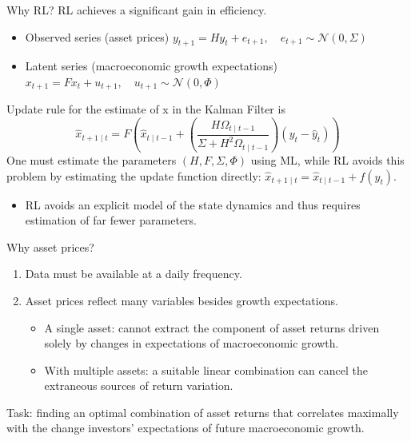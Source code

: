\documentclass[UTF8, 16pt]{beamer}
\begin{document}
\begin{CJK*}{UTF8}{gbsn}
\begin{frame}{Why RL? RL achieves a significant gain in efficiency.}
	\begin{itemize}
		\item Observed series (asset prices)
			$y_{t+1}=H y_{t}+e_{t+1}, \quad e_{t+1} \sim \mathcal{N}(0, \Sigma)$
		\item Latent series (macroeconomic growth expectations)
			$x_{t+1}=F x_{t}+u_{t+1}, \quad u_{t+1} \sim \mathcal{N}(0, \Phi)$
	\end{itemize}
	Update rule for the estimate of x in the \alert{Kalman Filter} is
	$$\hat{x}_{t+1 \mid t}=F\left(\hat{x}_{t \mid t-1}+\left(\frac{H \Omega_{t \mid t-1}}{\Sigma+H^{2} \Omega_{t \mid t-1}}\right)\left(y_{t}-\hat{y}_{t}\right)\right)$$
	One must estimate the parameters $(H, F, \Sigma, \Phi)$ using ML, while \alert{RL} avoids this problem by estimating the update function directly: $\hat{x}_{t+1 \mid t}=\hat{x}_{t \mid t-1}+f\left(y_{t}\right)$.
	\begin{itemize}
		\item RL avoids an explicit model of the state dynamics and thus requires estimation of \alert{far fewer parameters}.
	\end{itemize}
\end{frame}

\begin{frame}{Why asset prices?}
	\begin{enumerate}
		\item Data must be available at a \alert{daily frequency}.
		\item Asset prices reflect many variables besides growth expectations.
			\begin{itemize}
				\item A single asset: cannot extract the component of asset returns driven \alert{solely} by changes in expectations of macroeconomic growth.
				\item With multiple assets: \alert{a suitable linear combination} can cancel the extraneous sources of return variation.
			\end{itemize}
	\end{enumerate}
	Task: finding an \alert{optimal combination of asset returns} that correlates maximally with the change \alert{investors' expectations of future macroeconomic growth}.
\end{frame}


\end{CJK*}
\end{document}
